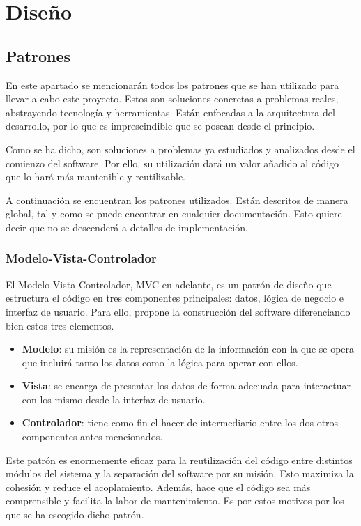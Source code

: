 
\chapter{Diseño}\label{diseno}
\section{Patrones}\label{sec:patrones}

En este apartado se mencionarán todos los patrones que se han utilizado para llevar a cabo este proyecto. Estos son soluciones concretas a problemas reales, abstrayendo tecnología y herramientas. Están enfocadas a la arquitectura del desarrollo, por lo que es imprescindible que se posean desde el principio.

Como se ha dicho, son soluciones a problemas ya estudiados y analizados desde el comienzo del software. Por ello, su utilización dará un valor añadido al código que lo hará más mantenible y reutilizable.

A continuación se encuentran los patrones utilizados. Están descritos de manera global, tal y como se puede encontrar en cualquier documentación. Esto quiere decir que no se descenderá a detalles de implementación.

\subsection{Modelo-Vista-Controlador}
El Modelo-Vista-Controlador, MVC en adelante, es un patrón de diseño que estructura el código en tres componentes principales: datos, lógica de negocio e interfaz de usuario. Para ello, propone la construcción del software diferenciando bien estos tres elementos.

\begin{itemize}
    \item \textbf{Modelo}: su misión es la representación de la información con la que se opera que incluirá tanto los datos como la lógica para operar con ellos.
    \item \textbf{Vista}: se encarga de presentar los datos de forma adecuada para interactuar con los mismo desde la interfaz de usuario.
    \item \textbf{Controlador}: tiene como fin el hacer de intermediario entre los dos otros componentes antes mencionados.
\end{itemize}

Este patrón es enormemente eficaz para la reutilización del código entre distintos módulos del sistema y la separación del software por su misión. Esto maximiza la cohesión y reduce el acoplamiento. Además, hace que el código sea más comprensible y facilita la labor de mantenimiento. Es por estos motivos por los que se ha escogido dicho patrón.

